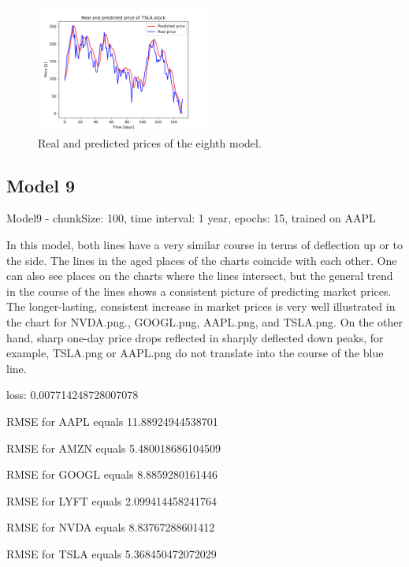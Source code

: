 \begin{figure}
\includegraphics[width=0.5\textwidth]{./graf/model8/TSLA.png}
\caption{Real and predicted prices of the eighth model.}
\label{fig:label}
\end{figure} 

\clearpage
\subsection{Model 9}

Model9 - chunkSize: 100, time interval: 1 year, epochs: 15, trained on AAPL\par\bigskip
In this model, both lines have a very similar course in terms of deflection up or to the side. The lines
in the aged places of the charts coincide with each other. One can also see places on the charts
where the lines intersect, but the general trend in the course of the lines shows a consistent picture
of predicting market prices. The longer-lasting, consistent increase in market prices is very well
illustrated in the chart for NVDA.png., GOOGL.png, AAPL.png, and TSLA.png. On the other hand,
sharp one-day price drops reflected in sharply deflected down peaks, for example, TSLA.png or AAPL.png
do not translate into the course of the blue line.
\par\bigskip
loss: 0.007714248728007078\par
RMSE for AAPL equals 11.88924944538701\par
RMSE for AMZN equals 5.480018686104509\par
RMSE for GOOGL equals 8.8859280161446\par
RMSE for LYFT equals 2.099414458241764\par
RMSE for NVDA equals 8.83767288601412\par
RMSE for TSLA equals 5.368450472072029\par


